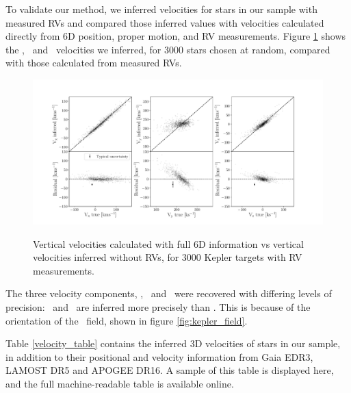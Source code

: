 To validate our method, we inferred velocities for stars in our sample with
measured RVs and compared those inferred values with velocities calculated
directly from 6D position, proper motion, and RV measurements.
Figure \ref{fig:residuals} shows the \vx, \vy\ and \vz\ velocities we
inferred, for 3000 stars chosen at random, compared with those calculated from
measured RVs.
\begin{figure}[ht!]
\caption{Vertical velocities calculated with full 6D information vs vertical
    velocities inferred without RVs, for 3000 Kepler targets with RV
    measurements.}
  \centering
    \includegraphics[width=1\textwidth]{residuals}
\label{fig:residuals}
\end{figure}

The three velocity components, \vx, \vy\ and \vz\ were recovered with
differing levels of precision: \vx\ and \vz\ are inferred more precisely than
\vy.
This is because of the orientation of the \kepler\ field, shown in figure
\ref{fig:kepler_field}.

Table \ref{velocity_table} contains the inferred 3D velocities of stars in our
sample, in addition to their positional and velocity information from
Gaia EDR3, LAMOST DR5 and APOGEE DR16.
A sample of this table is displayed here, and the full machine-readable table
is available online.

